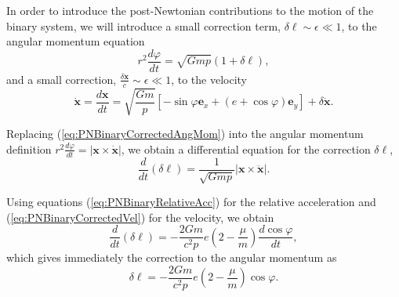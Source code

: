 In order to introduce the post-Newtonian contributions to the motion of the binary system, we will introduce a small correction term, $\delta \ell \sim \epsilon \ll 1$, to the angular momentum equation
\begin{equation}
r^2 \frac{d\varphi}{dt} = \sqrt{Gmp} (1 + \delta \ell), \label{eq:PNBinaryCorrectedAngMom}
\end{equation}
and a small correction, $\frac{\delta \dot{\textbf{x}}}{c} \sim \epsilon \ll 1$, to the velocity
\begin{equation}
\dot{\textbf{x}} = \frac{d \textbf{x}}{dt}  = \sqrt{\frac{Gm}{p}} \left[ -\sin \varphi \textbf{e}_x + (e+\cos \varphi)\textbf{e}_y \right] + \delta \dot{\textbf{x}}. \label{eq:PNBinaryCorrectedVel}
\end{equation}

Replacing (\ref{eq:PNBinaryCorrectedAngMom}) into the angular momentum definition $r^2 \frac{d\varphi}{dt}  = \left| \textbf{x} \times \dot{\textbf{x}}\right|$, we obtain a differential equation for the correction $\delta \ell$,
\begin{equation}
\frac{d}{dt} \left( \delta \ell \right) = \frac{1}{\sqrt{Gmp}} \left| \textbf{x} \times \ddot{\textbf{x}}\right|.
\end{equation}

Using equations (\ref{eq:PNBinaryRelativeAcc}) for the relative acceleration and (\ref{eq:PNBinaryCorrectedVel}) for the velocity, we obtain 
\begin{equation}
\frac{d}{dt} \left( \delta \ell \right) = - \frac{2Gm}{c^2 p} e \left( 2 - \frac{\mu}{m} \right) \frac{d \cos \varphi}{dt},
\end{equation}
which gives immediately the correction to the angular momentum as
 \begin{equation}
 \delta \ell  = - \frac{2Gm}{c^2 p} e \left( 2 - \frac{\mu}{m} \right) \cos \varphi . \label{eq:PNBinaryCorrectiontoAngMom}
\end{equation}

